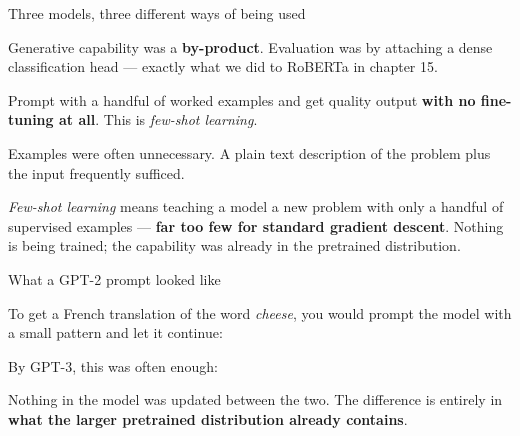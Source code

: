 \documentclass[aspectratio=169,11pt,t]{beamer}
\begin{document}
\begin{frame}[shrink=25]{Three models, three different ways of being used}
\begin{minipage}[t]{0.3253\textwidth}
\begin{icard}
Generative capability was a \textbf{by-product}. Evaluation was by attaching a dense classification head --- exactly what we did to RoBERTa in chapter 15.
\end{icard}
\end{minipage}%
\hfill
\begin{minipage}[t]{0.3253\textwidth}
\begin{icardaccent}
Prompt with a handful of worked examples and get quality output \textbf{with no fine-tuning at all}. This is \textit{few-shot learning}.
\end{icardaccent}
\end{minipage}%
\hfill
\begin{minipage}[t]{0.3253\textwidth}
\begin{icardaccent}
Examples were often unnecessary. A plain text description of the problem plus the input frequently sufficed.
\end{icardaccent}
\end{minipage}%
{\fontsize{9.4}{12.6}\selectfont\color{fg2}\textit{Few-shot learning} means teaching a model a new problem with only a handful of supervised examples --- \textbf{far too few for standard gradient descent}. Nothing is being trained; the capability was already in the pretrained distribution.\par}\vskip 4pt
\end{frame}

\begin{frame}[shrink=25]{What a GPT-2 prompt looked like}
{\fontsize{9.4}{12.6}\selectfont\color{fg2}To get a French translation of the word \textit{cheese}, you would prompt the model with a small pattern and let it continue:\par}\vskip 4pt
{\fontsize{9.4}{12.6}\selectfont\color{fg2}By GPT-3, this was often enough:\par}\vskip 4pt
{\fontsize{9.4}{12.6}\selectfont\color{fg2}Nothing in the model was updated between the two. The difference is entirely in \textbf{what the larger pretrained distribution already contains}.\par}\vskip 4pt
\end{frame}
\end{document}
